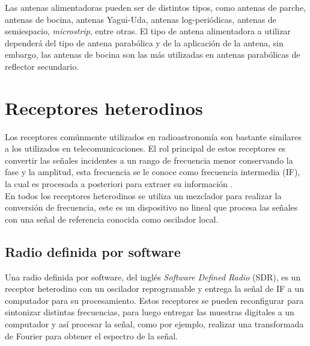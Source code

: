 Las antenas alimentadoras pueden ser de distintos tipos, como antenas de parche, antenas de bocina, antenas Yagui-Uda, antenas log-periódicas, antenas de semiespacio, \textit{microstrip}, entre otras. El tipo de antena alimentadora a utilizar dependerá del tipo de antena parabólica y de la aplicación de la antena, sin embargo, las antenas de bocina son las más utilizadas en antenas parabólicas de reflector secundario.\\


\section{Receptores heterodinos}

Los receptores comúnmente utilizados en radioastronomía son bastante similares a los utilizados en telecomunicaciones. El rol principal de estos receptores es convertir las señales incidentes a un rango de frecuencia menor conservando la fase y la amplitud, esta frecuencia se le conoce como frecuencia intermedia (IF), la cual es procesada a posteriori para extraer su información \cite{Finger2013}.\\

En todos los receptores heterodinos se utiliza un mezclador para realizar la conversión de frecuencia, este es un dispositivo no lineal que procesa las señales con una señal de referencia conocida como oscilador local.\\


\subsection{Radio definida por software}

Una radio definida por software, del inglés \textit{Software Defined Radio} (SDR), es un receptor heterodino con un oscilador reprogramable y entrega la señal de IF a un computador para su procesamiento. Estos receptores se pueden reconfigurar para sintonizar distintas frecuencias, para luego entregar las muestras digitales a un computador y así procesar la señal, como por ejemplo, realizar una transformada de Fourier para obtener el espectro de la señal.\\





